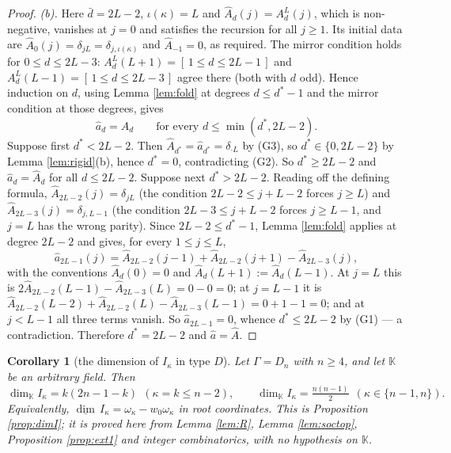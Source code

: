 \documentclass[reqno]{amsart}
\theoremstyle{plain}
\newtheorem{corollary}[theorem]{Corollary}
\theoremstyle{definition}
\newcommand{\dimv}{\underline{\dim}\,}
\newcommand{\om}{\omega}
\newcommand{\ka}{\kappa}
\begin{document}
\begin{proof}
\emph{(b).}  Here $\bar d=2L-2$, $\iota(\ka)=L$ and $\hat A_d(j)=A^{L}_d(j)$,
which is non-negative, vanishes at $j=0$ and satisfies the recursion for all
$j\ge1$.  Its initial data are $\hat A_0(j)=\delta_{jL}=\delta_{j,\iota(\ka)}$
and $\hat A_{-1}=0$, as required.  The mirror condition holds for
$0\le d\le2L-3$: $A^{L}_d(L+1)=[\,1\le d\le2L-1\,]$ and
$A^{L}_d(L-1)=[\,1\le d\le 2L-3\,]$ agree there (both with $d$ odd).  Hence
induction on $d$, using Lemma \ref{lem:fold} at degrees $d\le d^{*}-1$ and
the mirror condition at those degrees, gives
\[
   \hat a_d=\hat A_d\qquad\text{for every } d\le\min(d^{*},2L-2).
\]
Suppose first $d^{*}<2L-2$.  Then $\hat A_{d^{*}}=\hat a_{d^{*}}
=\delta_{\cdot L}$ by (G3), so $d^{*}\in\{0,2L-2\}$ by Lemma
\ref{lem:rigid}(b), hence $d^{*}=0$, contradicting (G2).  So
$d^{*}\ge2L-2$ and $\hat a_d=\hat A_d$ for all $d\le2L-2$.  Suppose next
$d^{*}>2L-2$.  Reading off the defining formula,
$\hat A_{2L-2}(j)=\delta_{jL}$ (the condition $2L-2\le j+L-2$ forces $j\ge L$)
and $\hat A_{2L-3}(j)=\delta_{j,L-1}$ (the condition $2L-3\le j+L-2$ forces
$j\ge L-1$, and $j=L$ has the wrong parity).  Since $2L-2\le d^{*}-1$, Lemma
\ref{lem:fold} applies at degree $2L-2$ and gives, for every $1\le j\le L$,
\[
   \hat a_{2L-1}(j)=\hat A_{2L-2}(j-1)+\hat A_{2L-2}(j+1)-\hat A_{2L-3}(j),
\]
with the conventions $\hat A_{d}(0)=0$ and $\hat A_d(L+1):=\hat A_d(L-1)$.
At $j=L$ this is $2\hat A_{2L-2}(L-1)-\hat A_{2L-3}(L)=0-0=0$; at $j=L-1$ it
is $\hat A_{2L-2}(L-2)+\hat A_{2L-2}(L)-\hat A_{2L-3}(L-1)=0+1-1=0$; and at
$j<L-1$ all three terms vanish.  So $\hat a_{2L-1}=0$, whence $d^{*}\le2L-2$
by (G1) --- a contradiction.  Therefore $d^{*}=2L-2$ and $\hat a=\hat A$.
\end{proof}

\begin{corollary}[the dimension of $I_\ka$ in type $D$]\label{cor:dimI}
Let $\Gamma=D_n$ with $n\ge4$, and let $\mathbb{K}$ be an arbitrary field.
Then
\[
   \dim_{\mathbb{K}}I_\ka=k(2n-1-k)\ \ (\ka=k\le n-2),
   \qquad
   \dim_{\mathbb{K}}I_\ka=\tfrac{n(n-1)}{2}\ \ (\ka\in\{n-1,n\}).
\]
Equivalently, $\dimv I_\ka=\om_\ka-w_0\om_\ka$ in root coordinates.  This is
Proposition \ref{prop:dimI}; it is proved here from Lemma
\ref{lem:R}, Lemma \ref{lem:soctop}, Proposition \ref{prop:ext1} and integer
combinatorics, with no hypothesis on $\mathbb{K}$.
\end{corollary}
\end{document}
